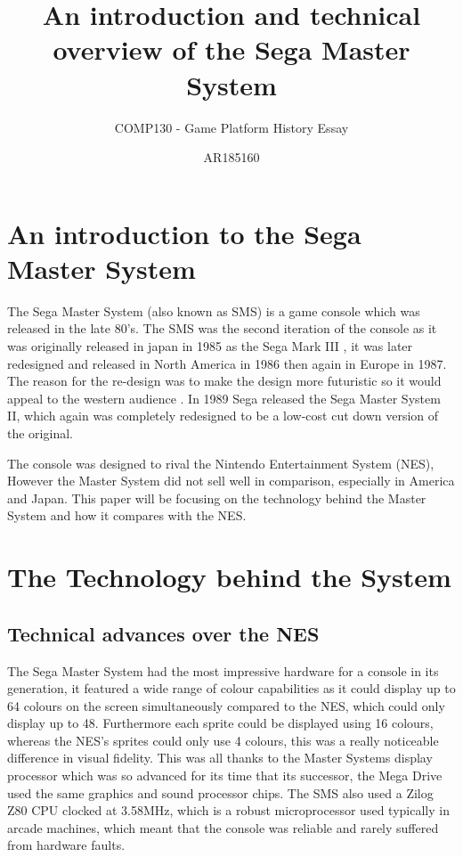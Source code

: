 \documentclass{scrartcl}
\title{An introduction and technical overview of the Sega Master System}
\subtitle{COMP130 - Game Platform History Essay}
\author{AR185160}
\begin{document}
\maketitle



\section{An introduction to the Sega Master System}

The Sega Master System (also known as SMS) is a game console which was released in the late 80’s. The SMS was the second iteration of the console as it was originally released in japan in 1985 as the Sega Mark III \cite{Weiss2009}, it was later redesigned and released in North America in 1986 then again in Europe in 1987. The reason for the re-design was to make the design more futuristic so it would appeal to the western audience \cite{parkin}. In 1989 Sega released the Sega Master System II, which again was completely redesigned to be a low-cost cut down version of the original.

The console was designed to rival the Nintendo Entertainment System (NES), However the Master System did not sell well in comparison, especially in America and Japan. \cite{Orland} This paper will be focusing on the technology behind the Master System and how it compares with the NES.

\section{The Technology behind the System}

\subsection{Technical advances over the NES}

The Sega Master System had the most impressive hardware for a console in its generation, it featured a wide range of colour capabilities as it could display up to 64 colours on the screen simultaneously compared to the NES\cite{racket}, which could only display up to 48. Furthermore each sprite could be displayed using 16 colours, whereas the NES's sprites could only use 4 colours\cite{NESsoftwaremanual}, this was a really noticeable difference in visual fidelity. This was all thanks to the Master Systems display processor which was so advanced for its time that its successor, the Mega Drive used the same graphics and sound processor chips. The SMS also used a Zilog Z80 CPU clocked at 3.58MHz\cite{SegaSoftwareManual}, which is a robust microprocessor used typically in arcade machines, which meant that the console was reliable and rarely suffered from hardware faults.\cite{russell} 
\end{document}
